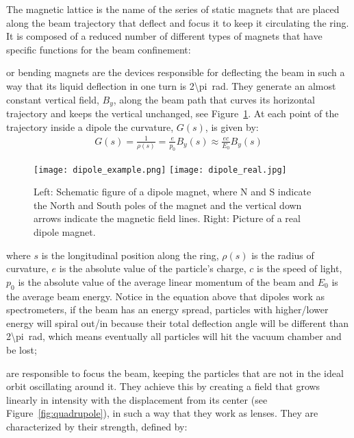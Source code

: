     The magnetic lattice is the name of the series of static magnets that are placed along the beam trajectory that deflect and focus it to keep it circulating the ring. It is composed of a reduced number of different types of magnets that have specific functions for the beam confinement:
    \begin{description}[align=left]
        \item[Dipoles:] or bending magnets are the devices responsible for deflecting the beam in such a way that its liquid deflection in one turn is \SI{2\pi}{\radian}. They generate an almost constant vertical field, $B_y$, along the beam path that curves its horizontal trajectory and keeps the vertical unchanged, see Figure~\ref{fig:dipole}. At each point of the trajectory inside a dipole the curvature, $G(s)$, is given by:
        \begin{align}\label{eq:curvature_dipole}
            G(s) = \frac{1}{\rho(s)} = \frac{e}{p_0}B_y(s) \approx \frac{ec}{E_0}B_y(s)
        \end{align}
        \begin{figure}[t!]
            \center
            \texttt{[image: dipole\_example.png]}
            \texttt{[image: dipole\_real.jpg]}
            \caption[Example of dipole magnet.]{Left: Schematic figure of a dipole magnet, where N and S indicate the North and South poles of the magnet and the vertical down arrows indicate the magnetic field lines. Right: Picture of a real dipole magnet.}
            \label{fig:dipole}
        \end{figure}
        where $s$ is the longitudinal position along the ring, $\rho(s)$ is the radius of curvature, $e$ is the absolute value of the particle's charge, $c$ is the speed of light, $p_0$ is the absolute value of the average linear momentum of the beam and $E_0$ is the average beam energy. Notice in the equation above that dipoles work as spectrometers, if the beam has an energy spread, particles with higher/lower energy will spiral out/in because their total deflection angle will be different than \SI{2\pi}{\radian}, which means eventually all particles will hit the vacuum chamber and be lost;
        \item[Quadrupoles:] are responsible to focus the beam, keeping the particles that are not in the ideal orbit oscillating around it. They achieve this by creating a field that grows linearly in intensity with the displacement from its center (see Figure~\ref{fig:quadrupole}), in such a way that they work as lenses. They are characterized by their strength, defined by:

\end{description}
